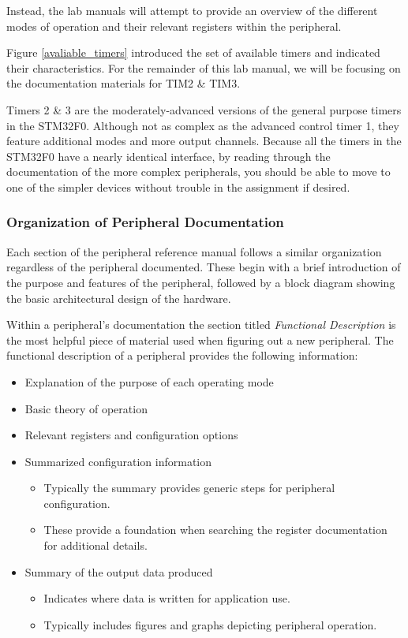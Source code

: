 \documentclass[11pt,fleqn]{book} %
\begin{document}
    Instead, the lab manuals will attempt to provide an overview of the different modes of operation and their relevant registers within the peripheral.

    Figure \ref{avaliable_timers} introduced the set of available timers and indicated their characteristics. For the remainder of this lab manual, we will be focusing on the documentation materials for TIM2 \& TIM3. 
    
    Timers 2 \& 3 are the moderately-advanced versions of the general purpose timers in the STM32F0. Although not as complex as the advanced control timer 1, they feature additional modes and more output channels. Because all the timers in the STM32F0 have a nearly identical interface, by reading through the documentation of the more complex peripherals, you should be able to move to one of the simpler devices without trouble in the assignment if desired. 
    
    \subsubsection{Organization of Peripheral Documentation}
    Each section of the peripheral reference manual follows a similar organization regardless of the peripheral documented. These begin with a brief introduction of the purpose and features of the peripheral, followed by a block diagram showing the basic architectural design of the hardware. 
    
    Within a peripheral's documentation the section titled \textit{Functional Description} is the most helpful piece of material used when figuring out a new peripheral. The functional description of a peripheral provides the following information:
    
    \begin{itemize}
        \item Explanation of the purpose of each operating mode 
        \item Basic theory of operation 
        \item Relevant registers and configuration options 
        \item Summarized configuration information
        \begin{itemize}
            \item Typically the summary provides generic steps for peripheral configuration. 
            \item These provide a foundation when searching the register documentation for additional details. 
        \end{itemize}
        \item Summary of the output data produced
        \begin{itemize}
            \item Indicates where data is written for application use.
            \item Typically includes figures and graphs depicting peripheral operation.
        \end{itemize}
    \end{itemize}
\end{document}

